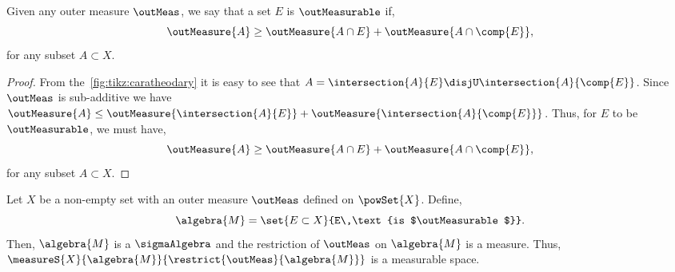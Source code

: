 \begin{Proposition}\label{prop:carath_crit}
    Given any outer measure $\outMeas$, we say that a set $E$ is $\outMeasurable$ if,
    \[\outMeasure{A} \geq \outMeasure{A\cap E} + \outMeasure{A\cap \comp{E}},\]
    for any subset $A \subset X$.
\end{Proposition}
\begin{proof}
    From the~\ref{fig:tikz:caratheodary} it is easy to see that $A = \intersection{A}{E} \disjU
    \intersection{A}{\comp{E}}$. Since $\outMeas$ is sub-additive we have $\outMeasure{A} \leq
    \outMeasure{\intersection{A}{E}} + \outMeasure{\intersection{A}{\comp{E}}}$. Thus, for $E$ to be
    $\outMeasurable$, we must have,
    \[\outMeasure{A} \geq \outMeasure{A\cap E} + \outMeasure{A\cap \comp{E}},\]
    for any subset $A \subset X$.
\end{proof}
\begin{Theorem}[name=Carath{\'e}odory Theorem]\label{thm:carath_restr_thm}
    Let $X$ be a non-empty set with an outer measure $\outMeas$ defined on $\powSet{X}$. Define,
    \[\algebra{M} = \set{E \subset X}{E\,\text{is $\outMeasurable$}}.\]
    Then, $\algebra{M}$ is a $\sigmaAlgebra$ and the restriction of $\outMeas$ on $\algebra{M}$
    is a measure. Thus, 
    $\measureS{X}{\algebra{M}}{\restrict{\outMeas}{\algebra{M}}}$ is a measurable space.
\end{Theorem}
